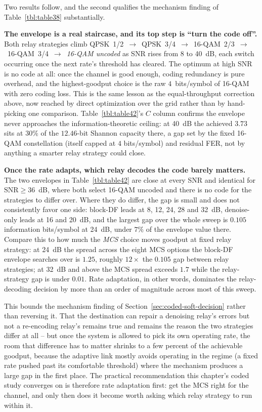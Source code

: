 Two results follow, and the second qualifies the mechanism finding of Table~\ref{tbl:table38} substantially.

\textbf{The envelope is a real staircase, and its top step is ``turn the code off''.} Both relay strategies climb QPSK~1/2~$\to$~QPSK~3/4~$\to$~16-QAM~2/3~$\to$~16-QAM~3/4~$\to$~\emph{16-QAM uncoded} as SNR rises from 8 to 40~dB, each switch occurring once the next rate's threshold has cleared. The optimum at high SNR is no code at all: once the channel is good enough, coding redundancy is pure overhead, and the highest-goodput choice is the raw $4$~bits/symbol of 16-QAM with zero coding loss. This is the same lesson as the equal-throughput correction above, now reached by direct optimization over the grid rather than by hand-picking one comparison. Table~\ref{tbl:table42}'s $C$ column confirms the envelope never approaches the information-theoretic ceiling: at 40~dB the achieved $3.73$ sits at $30\%$ of the $12.46$-bit Shannon capacity there, a gap set by the fixed 16-QAM constellation (itself capped at $4$ bits/symbol) and residual FER, not by anything a smarter relay strategy could close.

\textbf{Once the rate adapts, which relay decodes the code barely matters.} The two envelopes in Table~\ref{tbl:table42} are close at every SNR and identical for $\mathrm{SNR}\geq 36$~dB, where both select 16-QAM uncoded and there is no code for the strategies to differ over. Where they do differ, the gap is small and does not consistently favor one side: block-DF leads at 8, 12, 24, 28 and 32~dB, denoise-only leads at 16 and 20~dB, and the largest gap over the whole sweep is $0.105$ information bits/symbol at 24~dB, under $7\%$ of the envelope value there. Compare this to how much the \emph{MCS} choice moves goodput at fixed relay strategy: at 24~dB the spread across the eight MCS options the block-DF envelope searches over is $1.25$, roughly $12\times$ the $0.105$ gap between relay strategies; at 32~dB and above the MCS spread exceeds $1.7$ while the relay-strategy gap is under $0.01$. Rate adaptation, in other words, dominates the relay-decoding decision by more than an order of magnitude across most of this sweep.

This bounds the mechanism finding of Section~\ref{sec:coded-soft-decision} rather than reversing it. That the destination can repair a denoising relay's errors but not a re-encoding relay's remains true and remains the reason the two strategies differ at all -- but once the system is allowed to pick its own operating rate, the room that difference has to matter shrinks to a few percent of the achievable goodput, because the adaptive link mostly avoids operating in the regime (a fixed rate pushed past its comfortable threshold) where the mechanism produces a large gap in the first place. The practical recommendation this chapter's coded study converges on is therefore rate adaptation first: get the MCS right for the channel, and only then does it become worth asking which relay strategy to run within it.

